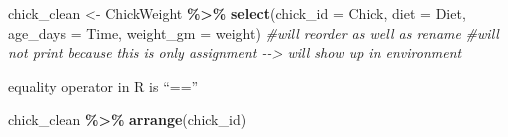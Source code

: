 \documentclass[
]{article}
\newenvironment{Shaded}{\begin{snugshade}}{\end{snugshade}}
\newcommand{\AttributeTok}[1]{\textcolor[rgb]{0.13,0.29,0.53}{#1}}
\newcommand{\CommentTok}[1]{\textcolor[rgb]{0.56,0.35,0.01}{\textit{#1}}}
\newcommand{\FunctionTok}[1]{\textcolor[rgb]{0.13,0.29,0.53}{\textbf{#1}}}
\newcommand{\NormalTok}[1]{#1}
\newcommand{\OtherTok}[1]{\textcolor[rgb]{0.56,0.35,0.01}{#1}}
\newcommand{\SpecialCharTok}[1]{\textcolor[rgb]{0.81,0.36,0.00}{\textbf{#1}}}
\begin{document}
\begin{Shaded}
\begin{Highlighting}[]
\NormalTok{chick\_clean }\OtherTok{\textless{}{-}}\NormalTok{ ChickWeight }\SpecialCharTok{\%\textgreater{}\%}
  \FunctionTok{select}\NormalTok{(}\AttributeTok{chick\_id =}\NormalTok{ Chick,}
         \AttributeTok{diet =}\NormalTok{ Diet,}
         \AttributeTok{age\_days =}\NormalTok{ Time,}
         \AttributeTok{weight\_gm =}\NormalTok{ weight) }\CommentTok{\#will reorder as well as rename}
\CommentTok{\#will not print because this is only assignment {-}{-}\textgreater{} will show up in environment}
\end{Highlighting}
\end{Shaded}

equality operator in R is ``==''

\begin{Shaded}
\begin{Highlighting}[]
\NormalTok{chick\_clean }\SpecialCharTok{\%\textgreater{}\%}
  \FunctionTok{arrange}\NormalTok{(chick\_id)}
\end{Highlighting}
\end{Shaded}
\end{document}
